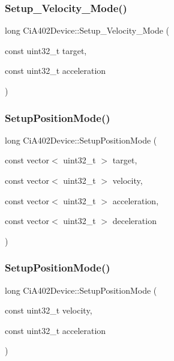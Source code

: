 \subsubsection{\texorpdfstring{Setup\+\_\+\+Velocity\+\_\+\+Mode()}{Setup\_Velocity\_Mode()}}
{\footnotesize\ttfamily long Ci\+A402\+Device\+::\+Setup\+\_\+\+Velocity\+\_\+\+Mode (\begin{DoxyParamCaption}\item[{const uint32\+\_\+t}]{target,  }\item[{const uint32\+\_\+t}]{acceleration }\end{DoxyParamCaption})}

\mbox{\label{classCiA402Device_abca4743b617d109a915215193bd06fbe}} 
\subsubsection{\texorpdfstring{Setup\+Position\+Mode()}{SetupPositionMode()}\hspace{0.1cm}{\footnotesize\ttfamily [1/2]}}
{\footnotesize\ttfamily long Ci\+A402\+Device\+::\+Setup\+Position\+Mode (\begin{DoxyParamCaption}\item[{const vector$<$ uint32\+\_\+t $>$}]{target,  }\item[{const vector$<$ uint32\+\_\+t $>$}]{velocity,  }\item[{const vector$<$ uint32\+\_\+t $>$}]{acceleration,  }\item[{const vector$<$ uint32\+\_\+t $>$}]{deceleration }\end{DoxyParamCaption})}

\mbox{\label{classCiA402Device_a221dbc5461823097981727a3baff5d0c}} 
\subsubsection{\texorpdfstring{Setup\+Position\+Mode()}{SetupPositionMode()}\hspace{0.1cm}{\footnotesize\ttfamily [2/2]}}
{\footnotesize\ttfamily long Ci\+A402\+Device\+::\+Setup\+Position\+Mode (\begin{DoxyParamCaption}\item[{const uint32\+\_\+t}]{velocity,  }\item[{const uint32\+\_\+t}]{acceleration }\end{DoxyParamCaption})}

